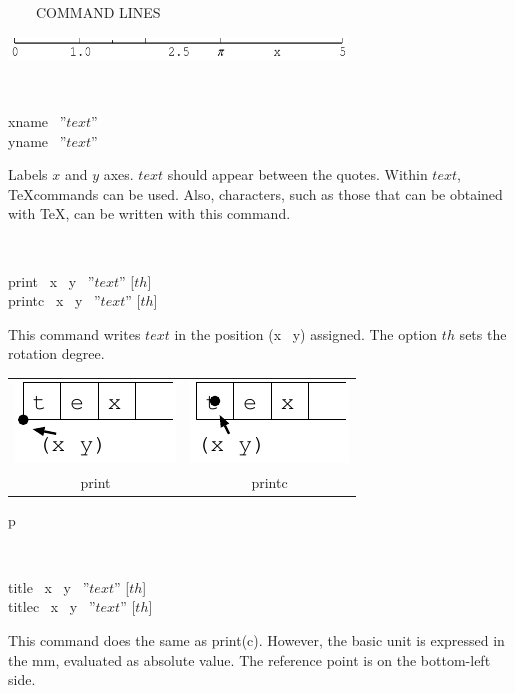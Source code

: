 \begin{qsection}{\ ~~~COMMAND LINES}
\begin{minipage}[t]{9cm}
\includegraphics[width=9cm]{fig/scale.pdf}
\end{minipage}\\

\hypertarget{xyname}{}
\begin{minipage}[t]{5.5cm}
xname ~''$text$''\\
yname ~''$text$''\\
\end{minipage}
\begin{minipage}[t]{9cm}
Labels $x$ and $y$ axes.
$text$ should appear between the quotes.
Within $text$, \TeX commands can be used.
Also, characters, such as those that can be obtained
with \TeX, can be written with this command.
\end{minipage}\\

\begin{minipage}[t]{5.5cm}
 print ~x ~y ~''$text$'' [$th$]\\
 printc ~x ~y ~''$text$'' [$th$]
\end{minipage}
\begin{minipage}[t]{9cm}
This command writes $text$ in the position (x ~y) assigned.
The option $th$ sets the rotation degree.

\begin{tabular}{cc}
\includegraphics{fig/fig-print1.pdf}&  
\includegraphics{fig/fig-print2.pdf}\\
print&printc
\end{tabular}p
\end{minipage}\\

\begin{minipage}[t]{5.5cm}
title ~x ~y ~''$text$'' [$th$]\\
titlec ~x ~y ~''$text$'' [$th$]
\end{minipage}
\begin{minipage}[t]{9cm}
This command does the same as print(c).
However, the basic unit is expressed in the mm, evaluated as absolute value.
The reference point is on the bottom-left side.
\end{minipage}\\


\end{qsection}
